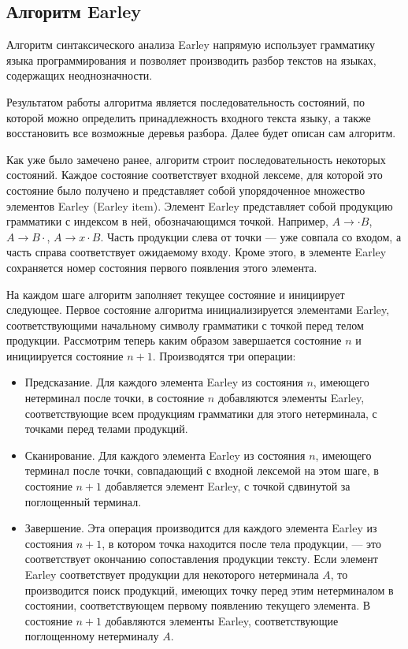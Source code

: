 \subsection{Алгоритм Earley}
Алгоритм синтаксического анализа Earley напрямую использует грамматику языка программирования и позволяет производить разбор текстов на языках, содержащих неоднозначности.

Результатом работы алгоритма является последовательность состояний, по которой можно определить принадлежность входного текста языку, а также восстановить все возможные деревья разбора. Далее будет описан сам алгоритм.

Как уже было замечено ранее, алгоритм строит последовательность некоторых состояний. Каждое состояние соответствует входной лексеме, для которой это состояние было получено и представляет собой упорядоченное множество элементов Earley (Earley item). Элемент Earley представляет собой продукцию грамматики с индексом в ней, обозначающимся точкой. Например, $A \to \cdot B$, $A \to B \cdot $, $A \to x \cdot B$. Часть продукции слева от точки --- уже совпала со входом, а часть справа соответствует ожидаемому входу. Кроме этого, в элементе Earley сохраняется номер состояния первого появления этого элемента.

На каждом шаге алгоритм заполняет текущее состояние и инициирует следующее. Первое состояние алгоритма инициализируется элементами Earley, соответствующими начальному символу грамматики с точкой перед телом продукции. Рассмотрим теперь каким образом завершается состояние $n$ и инициируется состояние $n+1$. Производятся три операции:

\begin{itemize}

\item Предсказание. Для каждого элемента Earley из состояния $n$, имеющего нетерминал после точки, в состояние $n$ добавляются элементы Earley, соответствующие всем продукциям грамматики для этого нетерминала, с точками перед телами продукций.

\item Сканирование. Для каждого элемента Earley из состояния $n$, имеющего терминал после точки, совпадающий с входной лексемой на этом шаге, в состояние $n+1$ добавляется элемент Earley, с точкой сдвинутой за поглощенный терминал.

\item Завершение. Эта операция производится для каждого элемента Earley из состояния $n+1$, в котором точка находится после тела продукции, --- это соответствует окончанию сопоставления продукции тексту. Если элемент Earley соответствует продукции для некоторого нетерминала $A$, то производится поиск продукций, имеющих точку перед этим нетерминалом в состоянии, соответствующем первому появлению текущего элемента. В состояние $n+1$ добавляются элементы Earley, соответствующие поглощенному нетерминалу $A$.

\end{itemize}

